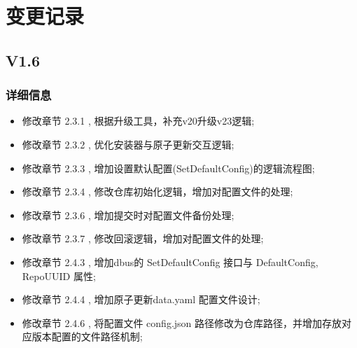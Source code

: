 \documentclass{utart}
\begin{document}
\section{变更记录}
\subsection{V1.6}
  \subsubsection{详细信息}
  \begin{itemize}[leftmargin=4em]
    \item 修改章节 2.3.1 , 根据升级工具，补充v20升级v23逻辑;
    \item 修改章节 2.3.2 , 优化安装器与原子更新交互逻辑;
    \item 修改章节 2.3.3 , 增加设置默认配置(SetDefaultConfig)的逻辑流程图;
    \item 修改章节 2.3.4 , 修改仓库初始化逻辑，增加对配置文件的处理;
    \item 修改章节 2.3.6 , 增加提交时对配置文件备份处理;
    \item 修改章节 2.3.7 , 修改回滚逻辑，增加对配置文件的处理;
    \item 修改章节 2.4.3 , 增加dbus的 SetDefaultConfig 接口与 DefaultConfig, RepoUUID 属性;
    \item 修改章节 2.4.4 , 增加原子更新data.yaml 配置文件设计;
    \item 修改章节 2.4.6 , 将配置文件 config.json 路径修改为仓库路径，并增加存放对应版本配置的文件路径机制;
    \end{itemize}
\end{document}

